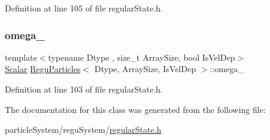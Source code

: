 Definition at line 105 of file regular\+State.\+h.

\mbox{\label{class_regu_particles_ab977f3d2781b5673d4c9b8cf329dcbbc}} 
\subsubsection{\texorpdfstring{omega\+\_\+}{omega\_}}
{\footnotesize\ttfamily template$<$typename Dtype , size\+\_\+t Array\+Size, bool Is\+Vel\+Dep$>$ \\
\mbox{\hyperlink{class_vel_indep_particles_a5d275b22f0d759f360ddd80e78f4b466}{Scalar}} \mbox{\hyperlink{class_regu_particles}{Regu\+Particles}}$<$ Dtype, Array\+Size, Is\+Vel\+Dep $>$\+::omega\+\_\+\hspace{0.3cm}{\ttfamily [protected]}}



Definition at line 103 of file regular\+State.\+h.



The documentation for this class was generated from the following file\+:\begin{DoxyCompactItemize}
\item 
particle\+System/regu\+System/\mbox{\hyperlink{regular_state_8h}{regular\+State.\+h}}\end{DoxyCompactItemize}
